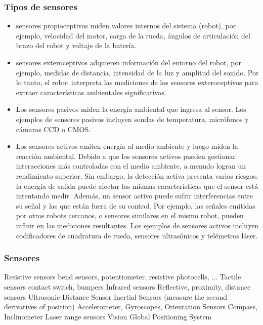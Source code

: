 \begin{frame}
    \frametitle{Tipos de sensores}

    \begin{itemize}
    \item sensores propioceptivos miden valores internos del sistema (robot), por ejemplo, velocidad del motor, carga de la rueda, ángulos de articulación del brazo del robot y voltaje de la batería.

    \item sensores exteroceptivos adquieren información del entorno del robot, por ejemplo, medidas de distancia, intensidad de la luz y amplitud del sonido. Por lo tanto, el robot interpreta las mediciones de los sensores exteroceptivos para extraer características ambientales significativas.
    \end{itemize}

    \begin{itemize}
    \item Los sensores pasivos miden la energía ambiental que ingresa al sensor. Los ejemplos de sensores pasivos incluyen sondas de temperatura, micrófonos y cámaras CCD o CMOS.

    \item Los sensores activos emiten energía al medio ambiente y luego miden la reacción ambiental. Debido a que los sensores activos pueden gestionar interacciones más controladas con el medio ambiente, a menudo logran un rendimiento superior. Sin embargo, la detección activa presenta varios riesgos: la energía de salida puede afectar las mismas características que el sensor está intentando medir. Además, un sensor activo puede sufrir interferencias entre su señal y las que están fuera de su control. Por ejemplo, las señales emitidas por otros robots cercanos, o sensores similares en el mismo robot, pueden influir en las mediciones resultantes. Los ejemplos de sensores activos incluyen codificadores de cuadratura de rueda, sensores ultrasónicos y telémetros láser.
\end{itemize}


\end{frame}


\begin{frame}
    \frametitle{Sensores}
    Resistive sensors
    bend sensors, potentiometer, resistive
    photocells, ...
    Tactile sensors
    contact switch, bumpers
    Infrared sensors
    Reflective, proximity, distance sensors
    Ultrasonic Distance Sensor
    Inertial Sensors (measure the second derivatives
    of position)
    Accelerometer, Gyroscopes,
    Orientation Sensors
    Compass, Inclinometer
    Laser range sensors
    Vision
    Global Positioning System
\end{frame}

